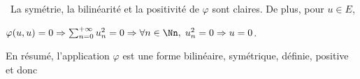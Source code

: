 {\begin{enumerate}
{\textbullet~La symétrie, la bilinéarité et la positivité de $\varphi$ sont claires. De plus, pour $u\in E$,

\begin{center}
$\varphi(u,u)=0\Rightarrow\sum_{n=0}^{+\infty}u_n^2=0\Rightarrow\forall n\in\Nn,\;u_n^2=0\Rightarrow u=0$.
\end{center}

En résumé, l'application $\varphi$ est une forme bilinéaire, symétrique, définie, positive et donc

\begin{center}
\end{center}}
\end{enumerate}
}
